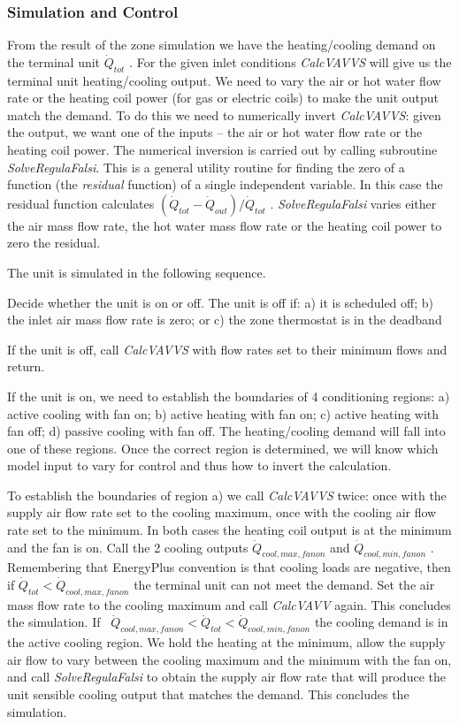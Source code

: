 \subsubsection{Simulation and Control}\label{simulation-and-control-3}

From the result of the zone simulation we have the heating/cooling demand on the terminal unit \({\dot Q_{tot}}\) . For the given inlet conditions \emph{CalcVAVVS} will give us the terminal unit heating/cooling output. We need to vary the air or hot water flow rate or the heating coil power (for gas or electric coils) to make the unit output match the demand. To do this we need to numerically invert \emph{CalcVAVVS}: given the output, we want one of the inputs -- the air or hot water flow rate or the heating coil power. The numerical inversion is carried out by calling subroutine \emph{SolveRegulaFalsi}. This is a general utility routine for finding the zero of a function (the \emph{residual} function) of a single independent variable. In this case the residual function calculates \(({\dot Q_{tot}} - {\dot Q_{out}})/{\dot Q_{tot}}\) . \emph{SolveRegulaFalsi} varies either the air mass flow rate, the hot water mass flow rate or the heating coil power to zero the residual.

The unit is simulated in the following sequence.

Decide whether the unit is on or off. The unit is off if: a) it is scheduled off; b) the inlet air mass flow rate is zero; or c) the zone thermostat is in the deadband

If the unit is off, call \emph{CalcVAVVS} with flow rates set to their minimum flows and return.

If the unit is on, we need to establish the boundaries of 4 conditioning regions: a) active cooling with fan on; b) active heating with fan on; c) active heating with fan off; d) passive cooling with fan off. The heating/cooling demand will fall into one of these regions. Once the correct region is determined, we will know which model input to vary for control and thus how to invert the calculation.

To establish the boundaries of region a) we call \emph{CalcVAVVS} twice: once with the supply air flow rate set to the cooling maximum, once with the cooling air flow rate set to the minimum. In both cases the heating coil output is at the minimum and the fan is on. Call the 2 cooling outputs \({\dot Q_{cool,max,fanon}}\) and \({\dot Q_{cool,min,fanon}}\) . Remembering that EnergyPlus convention is that cooling loads are negative, then if \({\dot Q_{tot}} < {\dot Q_{cool,max,fanon}}\) the terminal unit can not meet the demand. Set the air mass flow rate to the cooling maximum and call \emph{CalcVAVV} again. This concludes the simulation. If~ \({\dot Q_{cool,max,fanon}} < {\dot Q_{tot}} < {\dot Q_{cool,min,fanon}}\) the cooling demand is in the active cooling region. We hold the heating at the minimum, allow the supply air flow to vary between the cooling maximum and the minimum with the fan on, and call \emph{SolveRegulaFalsi} to obtain the supply air flow rate that will produce the unit sensible cooling output that matches the demand. This concludes the simulation.

